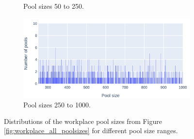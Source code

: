 \begin{figure}
\begin{subfigure}[b]{0.5\linewidth}
    \caption{Pool sizes 50 to 250.} 
    \label{fig:workplace_5-250_poolsizes} 
  \end{subfigure}%
  \begin{subfigure}[b]{0.5\linewidth}
    \centering
    \includegraphics[width=\linewidth]{3 - Stride/fig/workplace_250-1000_poolsizes.png} 
    \caption{Pool sizes 250 to 1000.} 
    \label{fig:workplace_250-1000_poolsizes} 
  \end{subfigure} 
  \caption{Distributions of the workplace pool sizes from Figure \ref{fig:workplace_all_poolsizes} for different pool size ranges.}
  \label{fig:workplace_poolsize_ranges} 
\end{figure}

\begin{table}
\centering
{}
\caption{Statistics for the different workplace pool size ranges. The pool sizes in every size range have approximately the same amount of pools.}
\label{tab:workplace_stats}
\end{table}

